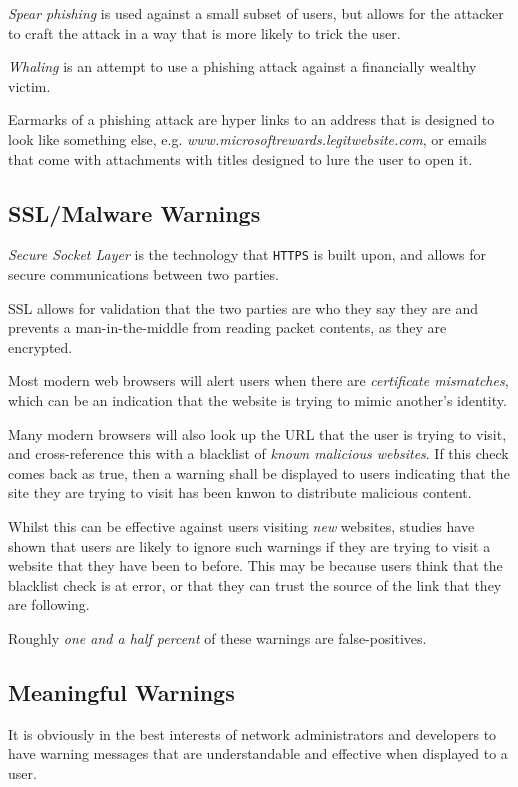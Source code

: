 \documentclass{article}
\begin{document}
\textit{Spear phishing} is used against a small subset of users, but allows for the attacker to craft the attack in a way that is more likely to trick the user.

\textit{Whaling} is an attempt to use a phishing attack against a financially wealthy victim.

Earmarks of a phishing attack are hyper links to an address that is designed to look like something else, e.g. \textit{www.microsoftrewards.legitwebsite.com}, or emails that come with attachments with titles designed to lure the user to open it.

\subsection{SSL/Malware Warnings}

\textit{Secure Socket Layer} is the technology that \texttt{HTTPS} is built upon, and allows for secure communications between two parties.

SSL allows for validation that the two parties are who they say they are and prevents a man-in-the-middle from reading packet contents, as they are encrypted.

Most modern web browsers will alert users when there are \textit{certificate mismatches}, which can be an indication that the website is trying to mimic another's identity.

Many modern browsers will also look up the URL that the user is trying to visit, and cross-reference this with a blacklist of \textit{known malicious websites}. If this check comes back as true, then a warning shall be displayed to users indicating that the site they are trying to visit has been knwon to distribute malicious content.

Whilst this can be effective against users visiting \textit{new} websites, studies have shown that users are likely to ignore such warnings if they are trying to visit a website that they have been to before. This may be because users think that the blacklist check is at error, or that they can trust the source of the link that they are following.

Roughly \textit{one and a half percent} of these warnings are false-positives.

\subsection{Meaningful Warnings}

It is obviously in the best interests of network administrators and developers to have warning messages that are understandable and effective when displayed to a user.
\end{document}
